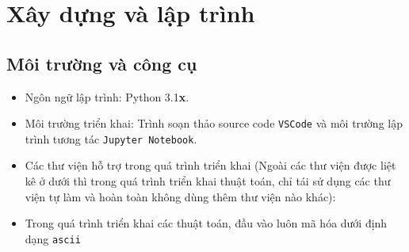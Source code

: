 \chapter{Xây dựng và lập trình}

\section{Môi trường và công cụ}

\begin{itemize}
	\item Ngôn ngữ lập trình: Python 3.1\textbf{x}.
	\item Môi trường triển khai: Trình soạn thảo source code \texttt{VSCode} và môi trường lập trình tương tác \texttt{Jupyter Notebook}.
	\item Các thư viện hỗ trợ trong quá trình triển khai (Ngoài các thư viện được liệt kê ở dưới thì trong quá trình triển khai thuật toán, chỉ tái sử dụng các thư viện tự làm và hoàn toàn không dùng thêm thư viện nào khác):

	\item Trong quá trình triển khai các thuật toán, đầu vào luôn mã hóa dưới định dạng \texttt{ascii}
\end{itemize}

